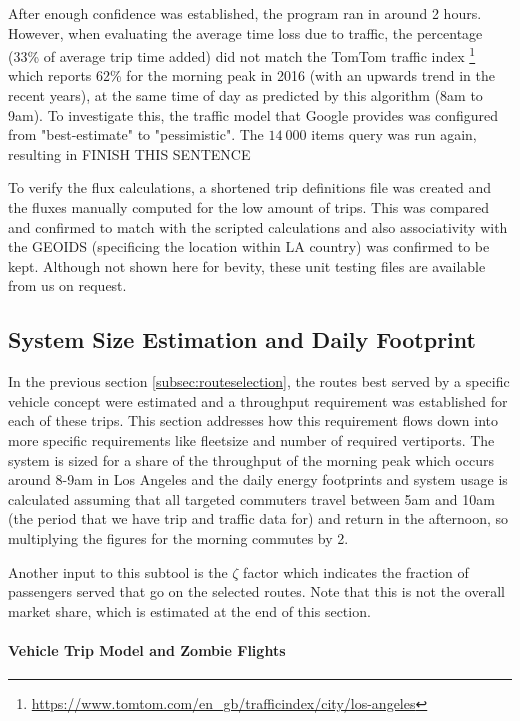 After enough confidence was established, the program ran in around 2 hours. However, when evaluating the average time loss due to traffic, the percentage (33\% of average trip time added) did not match the TomTom traffic index \footnote{\url{https://www.tomtom.com/en_gb/trafficindex/city/los-angeles}} which reports 62\% for the morning peak in 2016 (with an upwards trend in the recent years), at the same time of day as predicted by this algorithm (8am to 9am). To investigate this, the traffic model that Google provides was configured from "best-estimate" to "pessimistic". The $14\ 000$ items query was run again, resulting in FINISH THIS SENTENCE

To verify the flux calculations, a shortened trip definitions file was created and the fluxes manually computed for the low amount of trips. This was compared and confirmed to match with the scripted calculations and also associativity with the GEOIDS (specificing the location within LA country) was confirmed to be kept. Although not shown here for bevity, these unit testing files are available from us on request.
\fi



\subsection{System Size Estimation and Daily Footprint}

In the previous section \ref{subsec:routeselection}, the routes best served by a specific vehicle concept were estimated and a throughput requirement was established for each of these trips. This section addresses how this requirement flows down into more specific requirements like fleetsize and number of required vertiports. The system is sized for a share of the throughput of the morning peak which occurs around 8-9am in Los Angeles and the daily energy footprints and system usage is calculated assuming that all targeted commuters travel between 5am and 10am (the period that we have trip and traffic data for) and return in the afternoon, so multiplying the figures for the morning commutes by 2.

Another input to this subtool is the $\zeta$ factor which indicates the fraction of passengers served that go on the selected routes. Note that this is not the overall market share, which is estimated at the end of this section.


\paragraph{Vehicle Trip Model and Zombie Flights}

